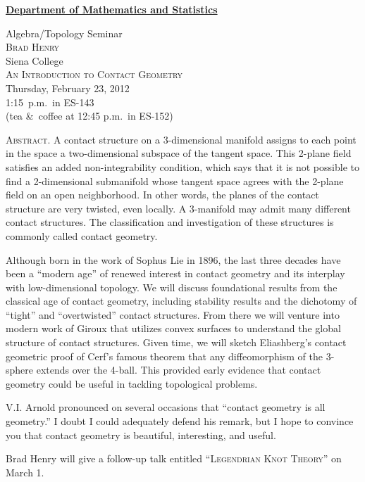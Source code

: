 \documentclass[12pt]{article}
\begin{document}
\noindent\hspace{-28pt}\raisebox{-19pt}{\XeTeXpicfile UAlogo.jpg scaled 340}%
\hfill\textsf{\textbf{\footnotesize\href{http://www.albany.edu/math/}{Department of Mathematics and Statistics}}}\bigskip\bigskip

\begin{center}\Large
  \textsf{\huge Algebra/Topology Seminar}\\[2.5\bigskipamount]
  \textsc{Brad Henry}\\
  {\large Siena College}\\[\bigskipamount]
  \textsc{An Introduction to Contact Geometry}\\[2\bigskipamount]
  Thursday, February 23, 2012\\ 1:15~p.m.\ in ES-143\\
  (tea \&\ coffee at 12:45 p.m.\ in ES-152)
\end{center}\bigskip\bigskip

\noindent\textsc{Abstract.}
A contact structure on a 3-dimensional manifold assigns to each point in the space a two-dimensional subspace of the tangent space. This 2-plane field satisfies an added non-integrability condition, which says that it is not possible to find a 2-dimensional submanifold whose tangent space agrees with the 2-plane field on an open neighborhood. In other words, the planes of the contact structure are very twisted, even locally. A 3-manifold may admit many different contact structures. The classification and investigation of these structures is commonly called contact geometry.

Although born in the work of Sophus Lie in 1896, the last three decades have been a “modern age” of renewed interest in contact geometry and its interplay with low-dimensional topology. We will discuss foundational results from the classical age of contact geometry, including stability results and the dichotomy of “tight” and “overtwisted” contact structures. From there we will venture into modern work of Giroux that utilizes convex surfaces to understand the global structure of contact structures. Given time, we will sketch Eliashberg’s contact geometric proof of Cerf’s famous theorem that any diffeomorphism of the 3-sphere extends over the 4-ball. This provided early evidence that contact geometry could be useful in tackling topological problems.

V.I. Arnold pronounced on several occasions that “contact geometry is all geometry.” I doubt I could adequately defend his remark, but I hope to convince you that contact geometry is beautiful, interesting, and useful.

\vfill\noindent\hrulefill
\begin{center}
Brad Henry will give a follow-up talk entitled \textsc{“Legendrian Knot Theory”} on March 1.
\end{center}
\end{document}
